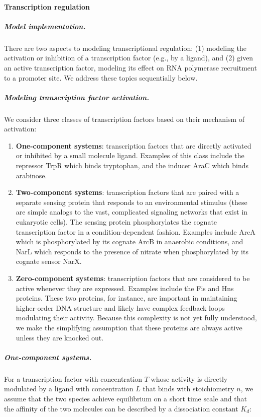 \documentclass[12pt]{article}
\begin{document}
\baselineskip24pt

\paragraph{Transcription regulation}
\label{sec:transcription_reg}

\subparagraph{Model implementation.}
There are two aspects to modeling transcriptional regulation: (1) modeling the activation or inhibition of a transcription factor (e.g., by a ligand), and (2) given an active transcription factor, modeling its effect on RNA polymerase recruitment to a promoter site.  We address these topics sequentially below.

\subparagraph{Modeling transcription factor activation.}
We consider three classes of transcription factors based on their mechanism of activation:

\begin{enumerate}
\item \textbf{One-component systems}: transcription factors that are directly activated or inhibited by a small molecule ligand.  Examples of this class include the repressor TrpR which binds tryptophan, and the inducer AraC which binds arabinose.

\item \textbf{Two-component systems}: transcription factors that are paired with a separate sensing protein that responds to an environmental stimulus (these are simple analogs to the vast, complicated signaling networks that exist in eukaryotic cells).  The sensing protein phosphorylates the cognate transcription factor in a condition-dependent fashion.  Examples include ArcA which is phosphorylated by its cognate ArcB in anaerobic conditions, and NarL which responds to the presence of nitrate when phosphorylated by its cognate sensor NarX.

\item \textbf{Zero-component systems}: transcription factors that are considered to be active whenever they are expressed.  Examples include the Fis and Hns proteins.  These two proteins, for instance, are important in maintaining higher-order DNA structure and likely have complex feedback loops modulating their activity.  Because this complexity is not yet fully understood, we make the simplifying assumption that these proteins are always active unless they are knocked out.
\end{enumerate}

\subparagraph{One-component systems.}
For a transcription factor with concentration \(T\) whose activity is directly modulated by a ligand with concentration \(L\) that binds with stoichiometry \(n\), we assume that the two species achieve equilibrium on a short time scale and that the affinity of the two molecules can be described by a dissociation constant \(K_d\):
\end{document}
